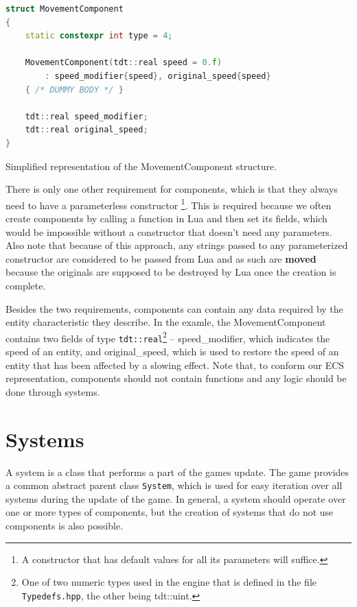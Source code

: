 \begin{listing}[H]
    \centering
    \begin{lstlisting}[language=C++]
struct MovementComponent
{
    static constexpr int type = 4;

    MovementComponent(tdt::real speed = 0.f)
        : speed_modifier{speed}, original_speed{speed}
    { /* DUMMY BODY */ }

    tdt::real speed_modifier;
    tdt::real original_speed;
}
    \end{lstlisting}
    \caption{Simplified representation of the MovementComponent structure.}
    \label{component-ex}
\end{listing}

There is only one other requirement for components, which is that they always need to have a parameterless constructor
\footnote{A constructor that has default values for all its parameters will suffice.}. This is required because
we often create components by calling a \cpp function in Lua and then set its fields, which would be impossible without a constructor that
doesn't need any parameters. Also note that because of this approach, any strings passed to any parameterized constructor are considered
to be passed from Lua and as such are \textbf{moved} because the originals are supposed to be destroyed by Lua once the creation is complete.

Besides the two requirements, components can contain any data required by the entity characteristic they describe. In the examle, the
MovementComponent contains two fields of type \texttt{tdt::real}\footnote{One of two numeric types used in the engine that is defined
in the file \texttt{Typedefs.hpp}, the other being tdt::uint.}
-- speed\_modifier, which indicates the speed of an entity, and original\_speed, which is used
to restore the speed of an entity that has been affected by a slowing effect. Note that, to conform our
ECS representation, components should not contain functions and any logic should be done through systems.

\section{Systems}

A system is a class that performs a part of the games update. The game provides a common abstract parent class \texttt{System}, which is
used for easy iteration over all systems during the update of the game. In general, a system should operate over one or more types of
components, but the creation of systems that do not use components is also possible.

